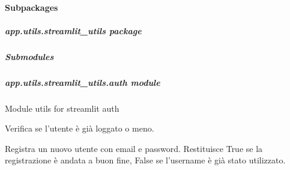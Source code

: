 \documentclass[letterpaper,10pt,english]{sphinxmanual}
\begin{document}
\paragraph{Subpackages}
\label{\detokenize{app.utils:subpackages}}
\sphinxstepscope


\subparagraph{app.utils.streamlit\_utils package}
\label{\detokenize{app.utils.streamlit_utils:app-utils-streamlit-utils-package}}\label{\detokenize{app.utils.streamlit_utils::doc}}

\subparagraph{Submodules}
\label{\detokenize{app.utils.streamlit_utils:submodules}}

\subparagraph{app.utils.streamlit\_utils.auth module}
\label{\detokenize{app.utils.streamlit_utils:module-app.utils.streamlit_utils.auth}}\label{\detokenize{app.utils.streamlit_utils:app-utils-streamlit-utils-auth-module}}
\sphinxAtStartPar
Module utils for streamlit auth

\begin{fulllineitems}
\label{\detokenize{app.utils.streamlit_utils:app.utils.streamlit_utils.auth.is_logged_in}}
\pysigstartsignatures
{}
\pysigstopsignatures
\sphinxAtStartPar
Verifica se l’utente è già loggato o meno.

\end{fulllineitems}


\begin{fulllineitems}
\label{\detokenize{app.utils.streamlit_utils:app.utils.streamlit_utils.auth.register_user}}
\pysigstartsignatures
{}
\pysigstopsignatures
\sphinxAtStartPar
Registra un nuovo utente con email e password.
Restituisce True se la registrazione è andata a buon fine,
False se l’username è già stato utilizzato.

\end{fulllineitems}
\end{document}
